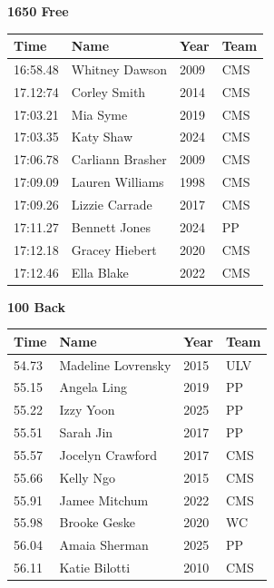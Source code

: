 \vspace{1.2em}
\noindent\begin{minipage}[t]{0.98\textwidth}
\centering
\textbf{\textcolor{teamprimary}{1650 Free}}\par
\vspace{0.5em}
\centering
\small
\renewcommand{\arraystretch}{1.0}
\setlength{\tabcolsep}{4pt}
\begin{tabular}{@{}p{2.5cm}p{4.5cm}p{1.5cm}p{2.5cm}@{}}
\toprule
\textbf{Time} & \textbf{Name} & \textbf{Year} & \textbf{Team} \\
\midrule
16:58.48 & Whitney Dawson & 2009 & CMS \\
17.12:74 & Corley Smith & 2014 & CMS \\
17:03.21 & Mia Syme & 2019 & CMS \\
17:03.35 & Katy Shaw & 2024 & CMS \\
17:06.78 & Carliann Brasher & 2009 & CMS \\
17:09.09 & Lauren Williams & 1998 & CMS \\
17:09.26 & Lizzie Carrade & 2017 & CMS \\
17:11.27 & Bennett Jones & 2024 & PP \\
17:12.18 & Gracey Hiebert & 2020 & CMS \\
17:12.46 & Ella Blake & 2022 & CMS \\
\bottomrule
\end{tabular}
\end{minipage}
\vspace{1.2em}
\noindent\begin{minipage}[t]{0.98\textwidth}
\centering
\textbf{\textcolor{teamprimary}{100 Back}}\par
\vspace{0.5em}
\centering
\small
\renewcommand{\arraystretch}{1.0}
\setlength{\tabcolsep}{4pt}
\begin{tabular}{@{}p{2.5cm}p{4.5cm}p{1.5cm}p{2.5cm}@{}}
\toprule
\textbf{Time} & \textbf{Name} & \textbf{Year} & \textbf{Team} \\
\midrule
54.73 & Madeline Lovrensky & 2015 & ULV \\
55.15 & Angela Ling & 2019 & PP \\
55.22 & Izzy Yoon & 2025 & PP \\
55.51 & Sarah Jin & 2017 & PP \\
55.57 & Jocelyn Crawford & 2017 & CMS \\
55.66 & Kelly Ngo & 2015 & CMS \\
55.91 & Jamee Mitchum & 2022 & CMS \\
55.98 & Brooke Geske & 2020 & WC \\
56.04 & Amaia Sherman & 2025 & PP \\
56.11 & Katie Bilotti & 2010 & CMS \\
\bottomrule
\end{tabular}
\end{minipage}
